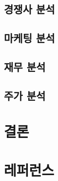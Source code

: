 \documentclass[11pt]{oblivoir}
\begin{document}
	
	
		\subsection{경쟁사 분석}
		
		\subsection{마케팅 분석}
		
		\subsection{재무 분석}
		
		\subsection{주가 분석}
	
	\section{결론}
	
	\section{레퍼런스}
	
\end{document}
